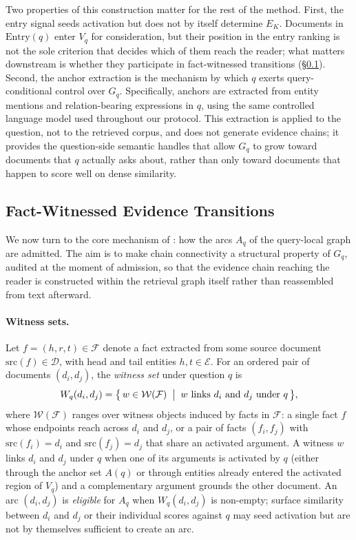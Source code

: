Two properties of this construction matter for the rest of the method.
First, the entry signal seeds activation but does not by itself determine
$E_K$. Documents in $\mathrm{Entry}(q)$ enter $V_q$ for consideration, but
their position in the entry ranking is not the sole criterion that decides
which of them reach the reader; what matters downstream is whether they
participate in fact-witnessed transitions
(\S\ref{sec:method:transition}). Second, the anchor extraction is the
mechanism by which $q$ exerts query-conditional control over $G_q$.
Specifically, anchors are extracted from entity mentions and
relation-bearing expressions in $q$, using the same controlled language
model used throughout our protocol. This extraction is applied to the
question, not to the retrieved corpus, and does not generate evidence
chains; it provides the question-side semantic handles that allow $G_q$
to grow toward documents that $q$ actually asks about, rather than only
toward documents that happen to score well on dense similarity.

\subsection{Fact-Witnessed Evidence Transitions}
\label{sec:method:transition}

We now turn to the core mechanism of \methodname{}: how the arcs $A_q$ of
the query-local graph are admitted. The aim is to make chain connectivity
a structural property of $G_q$, audited at the moment of admission, so
that the evidence chain reaching the reader is constructed within the
retrieval graph itself rather than reassembled from text afterward.

\paragraph{Witness sets.}
Let $f = (h, r, t) \in \mathcal{F}$ denote a fact extracted from some
source document $\mathrm{src}(f) \in \mathcal{D}$, with head and tail
entities $h, t \in \mathcal{E}$. For an ordered pair of documents
$(d_i, d_j)$, the \emph{witness set} under question $q$ is
\begin{equation}
\label{eq:witness-set}
W_q(d_i, d_j) = \bigl\{\, w \in \mathcal{W}(\mathcal{F}) \;\bigm|\;
w \text{ links } d_i \text{ and } d_j \text{ under } q \,\bigr\},
\end{equation}
where $\mathcal{W}(\mathcal{F})$ ranges over witness objects induced by
facts in $\mathcal{F}$: a single fact $f$ whose endpoints reach across
$d_i$ and $d_j$, or a pair of facts $(f_i, f_j)$ with
$\mathrm{src}(f_i) = d_i$ and $\mathrm{src}(f_j) = d_j$ that share an
activated argument. A witness $w$ links $d_i$ and $d_j$ under $q$ when one
of its arguments is activated by $q$ (either through the anchor set
$A(q)$ or through entities already entered the activated region of $V_q$)
and a complementary argument grounds the other document. An arc
$(d_i, d_j)$ is \emph{eligible} for $A_q$ when $W_q(d_i, d_j)$ is
non-empty; surface similarity between $d_i$ and $d_j$ or their individual
scores against $q$ may seed activation but are not by themselves
sufficient to create an arc.

